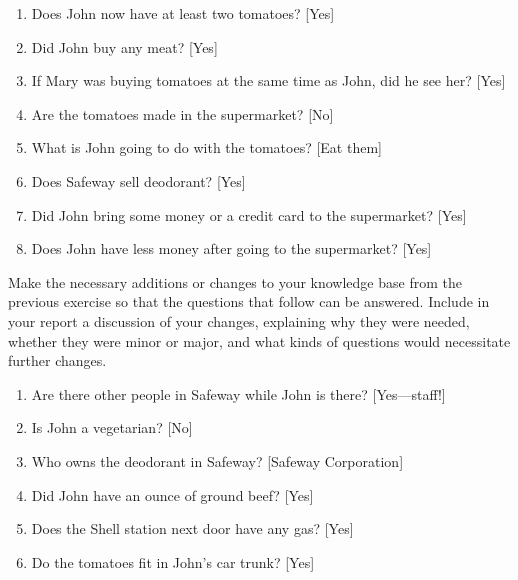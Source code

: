 \begin{exercise}
\begin{enumerate}
\item Does John now have at least two tomatoes?   [Yes]

\item Did John buy any meat?   [Yes]

\item If Mary was buying tomatoes at the same time as John, did he see her? [Yes]

\item Are the tomatoes made in the supermarket?   [No]

\item What is John going to do with the tomatoes?  [Eat them]

\item Does Safeway sell deodorant?   [Yes]

\item Did John bring some money or a credit card to the supermarket?   [Yes]

\item Does John have less money after going to the supermarket?   [Yes]
\end{enumerate}
\end{exercise} 

\begin{exercise}
Make the necessary additions or changes to your knowledge base from
the previous exercise so that the questions that follow can be
answered. Include in your report a discussion of your changes,
explaining why they were needed, whether they were minor or major, and
what kinds of questions would necessitate further changes.
\begin{enumerate}
\item Are there other people in Safeway while John is there? [Yes---staff!]
\item Is John a vegetarian? [No]
\item Who owns the deodorant in Safeway? [Safeway Corporation]
\item Did John have an ounce of ground beef? [Yes]
\item Does the Shell station next door have any gas? [Yes]
\item Do the tomatoes fit in John's car trunk? [Yes]
\end{enumerate}
\end{exercise} 



